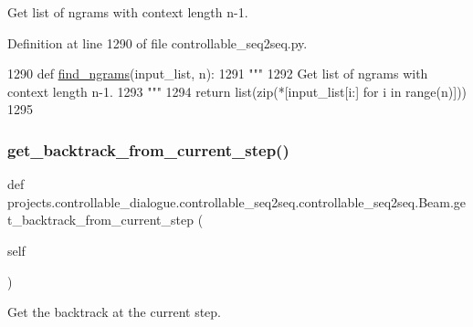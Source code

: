\begin{DoxyVerb}Get list of ngrams with context length n-1.
\end{DoxyVerb}
 

Definition at line 1290 of file controllable\+\_\+seq2seq.\+py.


\begin{DoxyCode}
1290     \textcolor{keyword}{def }\hyperlink{namespaceparlai_1_1agents_1_1legacy__agents_1_1seq2seq_1_1dict__v0_aa7398720bbf0f8e82c5b1495313f4f8b}{find\_ngrams}(input\_list, n):
1291         \textcolor{stringliteral}{"""}
1292 \textcolor{stringliteral}{        Get list of ngrams with context length n-1.}
1293 \textcolor{stringliteral}{        """}
1294         \textcolor{keywordflow}{return} list(zip(*[input\_list[i:] \textcolor{keywordflow}{for} i \textcolor{keywordflow}{in} range(n)]))
1295 
\end{DoxyCode}
\mbox{\label{classprojects_1_1controllable__dialogue_1_1controllable__seq2seq_1_1controllable__seq2seq_1_1Beam_a614a1a51ed1ac7e209282dc223f4c8fc}} 
\subsubsection{\texorpdfstring{get\+\_\+backtrack\+\_\+from\+\_\+current\+\_\+step()}{get\_backtrack\_from\_current\_step()}}
{\footnotesize\ttfamily def projects.\+controllable\+\_\+dialogue.\+controllable\+\_\+seq2seq.\+controllable\+\_\+seq2seq.\+Beam.\+get\+\_\+backtrack\+\_\+from\+\_\+current\+\_\+step (\begin{DoxyParamCaption}\item[{}]{self }\end{DoxyParamCaption})}

\begin{DoxyVerb}Get the backtrack at the current step.
\end{DoxyVerb}
 

